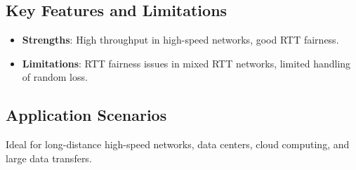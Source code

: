 \documentclass[11pt,a4paper]{article}
\begin{document}
\begin{tcolorbox}[colback=purple!5!white, colframe=purple!75!black, fonttitle=\bfseries, title=TCP CUBIC Overview]
\subsection{{Key Features and Limitations}}
\begin{itemize}
    \item \textbf{Strengths}: High throughput in high-speed networks, good RTT fairness.
    \item \textbf{Limitations}: RTT fairness issues in mixed RTT networks, limited handling of random loss.
\end{itemize}
\subsection{{Application Scenarios}}
Ideal for long-distance high-speed networks, data centers, cloud computing, and large data transfers.
\end{tcolorbox}

\end{document}
